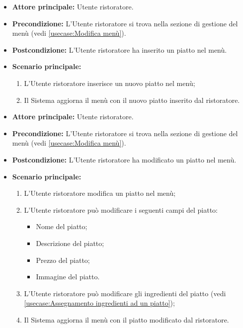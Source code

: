 \label{usecase:Inserimento piatto}
\begin{itemize}

	\item \textbf{Attore principale:} Utente ristoratore.

	\item \textbf{Precondizione:} L'Utente ristoratore si trova nella sezione di gestione del menù (vedi \autoref{usecase:Modifica menù}).

	\item \textbf{Postcondizione:} L'Utente ristoratore ha inserito un piatto nel menù.

	\item \textbf{Scenario principale:}
	\begin{enumerate}
		\item L'Utente ristoratore inserisce un nuovo piatto nel menù;
		\item Il Sistema aggiorna il menù con il nuovo piatto inserito dal ristoratore.
	\end{enumerate}

\end{itemize}


\label{usecase:Modifica piatto}
\begin{itemize}

	\item \textbf{Attore principale:} Utente ristoratore.

	\item \textbf{Precondizione:} L'Utente ristoratore si trova nella sezione di 
		gestione del menù (vedi \autoref{usecase:Modifica menù}).

	\item \textbf{Postcondizione:} L'Utente ristoratore ha modificato un 
		piatto nel menù.

	\item \textbf{Scenario principale:}
	\begin{enumerate}
		\item L'Utente ristoratore modifica un piatto nel menù;
		\item L'Utente ristoratore può modificare i seguenti campi del piatto:
			\begin{itemize}
				\item Nome del piatto;
				\item Descrizione del piatto;
				\item Prezzo del piatto;
				\item Immagine del piatto.
			\end{itemize}
		\item L'Utente ristoratore può modificare gli ingredienti del piatto
			(vedi \autoref{usecase:Assegnamento ingredienti ad un piatto});
		\item Il Sistema aggiorna il menù con il piatto modificato dal ristoratore.
	\end{enumerate}

\end{itemize}


